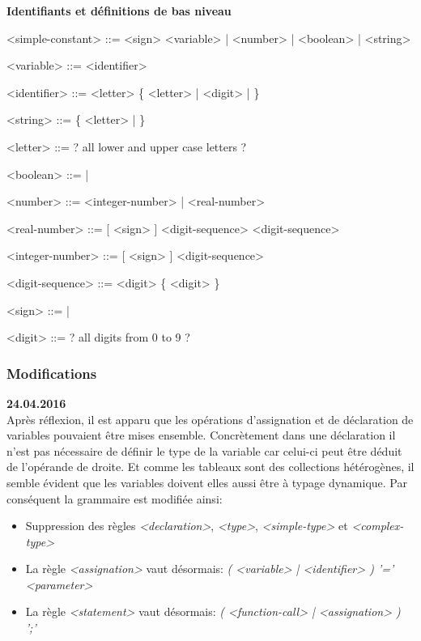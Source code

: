 \documentclass[french]{article}
\begin{document}
		\textbf{Identifiants et définitions de bas niveau}
		\begin{grammar}
			<simple-constant> ::= <sign> <variable> | <number> | <boolean> | <string>
			
			<variable> ::= <identifier>
			
			<identifier> ::= <letter> \{ <letter> | <digit> | \lit{\_} \}
			
			<string> ::=  \{ <letter> | \lit{ } \} 
			
			<letter> ::= ? all lower and upper case letters ? 
			
			<boolean> ::=  | 
			
			<number> ::= <integer-number> | <real-number>
			
			<real-number> ::= [ <sign> ] <digit-sequence>  <digit-sequence>
			
			<integer-number> ::= [ <sign> ] <digit-sequence>
			
			<digit-sequence> ::= <digit> \{ <digit> \}
			
			<sign> ::= \lit{+} | \lit{-} 
			
			<digit> ::= ? all digits from 0 to 9 ? 
		\end{grammar}
		
		\subsubsection{Modifications}
		\textbf{24.04.2016}\\
		Après réflexion, il est apparu que les opérations d'assignation et de déclaration de variables pouvaient être mises ensemble. Concrètement dans une déclaration il n'est pas nécessaire de définir le type de la variable car celui-ci peut être déduit de l'opérande de droite. Et comme les tableaux sont des collections hétérogènes, il semble évident que les variables doivent elles aussi être à typage dynamique. Par conséquent la grammaire est modifiée ainsi:
		\begin{itemize}
			\item Suppression des règles \textit{<declaration>}, \textit{<type>}, \textit{<simple-type>} et \textit{<complex-type>}
			\item La règle \textit{<assignation>} vaut désormais: \textit{( <variable> | <identifier> ) '=' <parameter>}
			\item La règle \textit{<statement>} vaut désormais: \textit{( <function-call> | <assignation> ) ';'}
		\end{itemize} 
		
\end{document}
